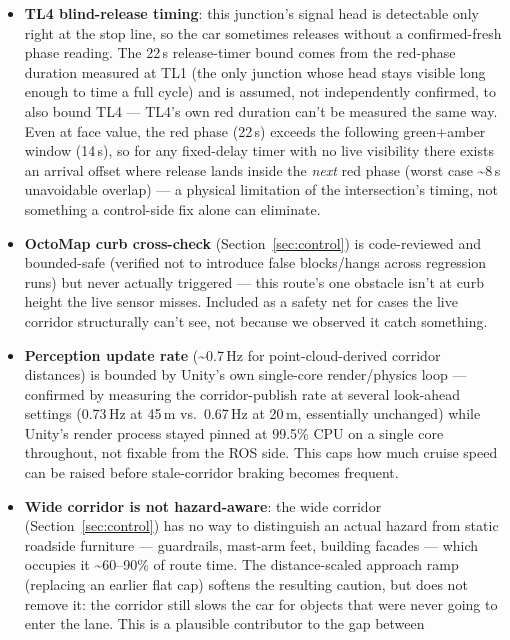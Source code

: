 \documentclass[10pt,twocolumn]{article}
\begin{document}
\begin{itemize}[leftmargin=*]
\item \textbf{TL4 blind-release timing}: this junction's signal head is
  detectable only right at the stop line, so the car sometimes releases
  without a confirmed-fresh phase reading. The 22\,s release-timer bound
  comes from the red-phase duration measured at TL1 (the only junction
  whose head stays visible long enough to time a full cycle) and is
  assumed, not independently confirmed, to also bound TL4 --- TL4's own
  red duration can't be measured the same way. Even at face value, the
  red phase (22\,s) exceeds the following green+amber window (14\,s), so
  for any fixed-delay timer with no live visibility there exists an
  arrival offset where release lands inside the \emph{next} red phase
  (worst case \textasciitilde{}8\,s unavoidable overlap) --- a physical
  limitation of the intersection's timing, not something a control-side
  fix alone can eliminate.
\item \textbf{OctoMap curb cross-check} (Section~\ref{sec:control}) is
  code-reviewed and bounded-safe (verified not to introduce false
  blocks/hangs across regression runs) but never actually triggered ---
  this route's one obstacle isn't at curb height the live sensor misses.
  Included as a safety net for cases the live corridor structurally
  can't see, not because we observed it catch something.
\item \textbf{Perception update rate} (\textasciitilde{}0.7\,Hz for
  point-cloud-derived corridor distances) is bounded by Unity's own
  single-core render/physics loop --- confirmed by measuring the
  corridor-publish rate at several look-ahead settings (0.73\,Hz at
  45\,m vs.\ 0.67\,Hz at 20\,m, essentially unchanged) while Unity's
  render process stayed pinned at 99.5\% CPU on a single core
  throughout, not fixable from the ROS side. This caps how much cruise
  speed can be raised before stale-corridor braking becomes frequent.
\item \textbf{Wide corridor is not hazard-aware}: the wide corridor
  (Section~\ref{sec:control}) has no way to distinguish an actual
  hazard from static roadside furniture --- guardrails, mast-arm feet,
  building facades --- which occupies it \textasciitilde{}60--90\% of
  route time. The distance-scaled approach ramp (replacing an earlier
  flat cap) softens the resulting caution, but does not remove it: the
  corridor still slows the car for objects that were never going to
  enter the lane. This is a plausible contributor to the gap between

\end{itemize}
\end{document}
